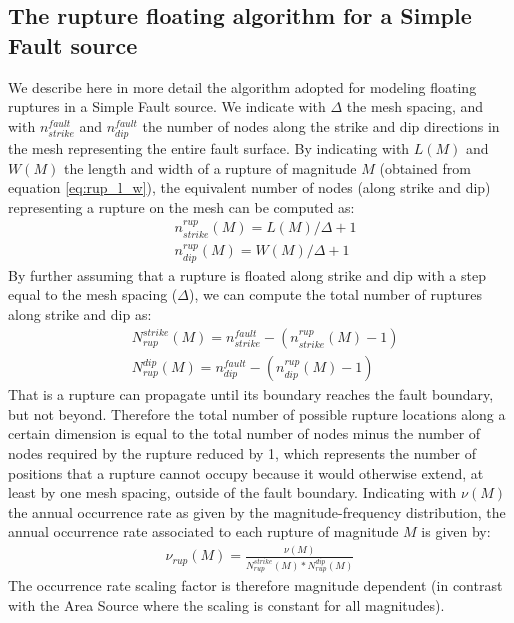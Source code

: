 \subsection{The rupture floating algorithm for a Simple Fault source}
We describe here in more detail the algorithm adopted for modeling floating ruptures in a Simple Fault source. We indicate with $\Delta$ the mesh spacing, and with $n_{strike}^{fault}$ and $n_{dip}^{fault}$ the number of nodes along the strike and dip directions in the mesh representing the entire fault surface. By indicating with $L(M)$ and $W(M)$ the length and width of a rupture of magnitude $M$ (obtained from equation \ref{eq:rup_l_w}), the equivalent number of nodes (along strike and dip) representing a rupture on the mesh can be computed as:
\begin{equation} \label{eq:rup_nodes}
\begin{split}
& n_{strike}^{rup}(M) =  L(M) / \Delta + 1 \\
& n_{dip}^{rup}(M)     = W(M) / \Delta + 1 
\end{split}
\end{equation}
By further assuming that a rupture is floated along strike and dip with a step equal to the mesh spacing ($\Delta$), we can compute the total number of ruptures along strike and dip as:
\begin{equation}
\begin{split}
& N_{rup}^{strike}(M) = n_{strike}^{fault} - (n_{strike}^{rup}(M) - 1) \\
& N_{rup}^{dip}(M)     = n_{dip}^{fault} - (n_{dip}^{rup}(M) - 1)
\end{split}
\end{equation}
That is a rupture can propagate until its boundary reaches the fault boundary, but not beyond. Therefore the total number of possible rupture locations along a certain dimension is equal to the total number of nodes minus the number of nodes required by the rupture reduced by 1, which represents the number of positions that a rupture
cannot occupy because it would otherwise extend, at least by one mesh spacing, outside of the fault boundary.
Indicating with $\nu(M)$ the annual occurrence rate as given by the magnitude-frequency distribution, the annual occurrence rate associated to each rupture of magnitude $M$ is given by:
\begin{align}
\nu_{rup}(M) = \frac{\nu(M)}{N_{rup}^{strike}(M) * N_{rup}^{dip}(M)}
\end{align}
The occurrence rate scaling factor is therefore magnitude dependent (in contrast with the Area Source where the scaling is constant for all magnitudes).


